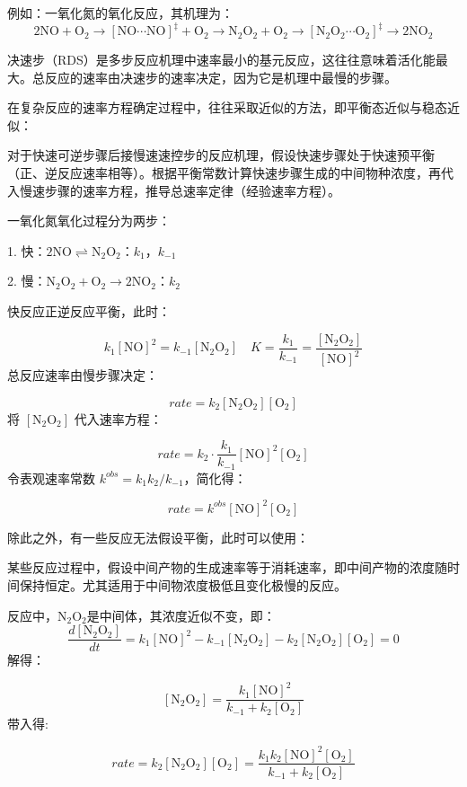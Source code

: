 例如：一氧化氮的氧化反应，其机理为：$$2\text{NO} + \text{O}_2 \longrightarrow [\text{NO} \cdots \text{NO}]^ \ddagger + \text{O}_2 \longrightarrow \text{N}_2\text{O}_2 + \text{O}_2 \longrightarrow  [\text{N}_2\text{O}_2 \cdots \text{O}_2]^\ddagger \longrightarrow 2\text{NO}_2 $$

\begin{definition}[决速步]
决速步（RDS）是多步反应机理中速率最小的基元反应，这往往意味着活化能最大。总反应的速率由决速步的速率决定，因为它是机理中最慢的步骤。
\end{definition}

在复杂反应的速率方程确定过程中，往往采取近似的方法，即平衡态近似与稳态近似：

\begin{proposition}[平衡态近似]
对于快速可逆步骤后接慢速速控步的反应机理，假设快速步骤处于快速预平衡（正、逆反应速率相等）。根据平衡常数计算快速步骤生成的中间物种浓度，再代入慢速步骤的速率方程，推导总速率定律（经验速率方程）。
\end{proposition}

\begin{example}
一氧化氮氧化过程分为两步：

1. 快：$2\text{NO} \rightleftharpoons  \text{N}_2\text{O}_2$：$k_{1}$，$k_{-1}$

2. 慢：$\text{N}_2\text{O}_2 + \text{O}_2 \longrightarrow 2\text{NO}_2$：$k_2$

快反应正逆反应平衡，此时：

$$k_1[\text{NO}]^2 = k_{-1}[\text{N}_2\text{O}_2] \quad K = \frac{k_1}{k_{-1}} = \frac{[\text{N}_2\text{O}_2]}{[\text{NO}]^2}$$
总反应速率由慢步骤决定：

$$rate = k_2 [\text{N}_2\text{O}_2][\text{O}_2]$$
将 $[\text{N}_2\text{O}_2]$ 代入速率方程：

$$rate = k_2 \cdot \frac{k_1}{k_{-1}} [\text{NO}]^2 [\text{O}_2]$$
令表观速率常数 $k^{obs} = k_1 k_2/k_{-1}$，简化得：

$$rate = k^{obs} [\text{NO}]^2 [\text{O}_2]$$
\end{example}

除此之外，有一些反应无法假设平衡，此时可以使用：

\begin{proposition}[稳态近似]
某些反应过程中，假设中间产物的生成速率等于消耗速率，即中间产物的浓度随时间保持恒定。尤其适用于中间物浓度极低且变化极慢的反应。
\end{proposition}

\begin{example}
反应中，$\text{N}_2\text{O}_2$是中间体，其浓度近似不变，即：
$$\frac{d[\text{N}_2\text{O}_2]}{dt} = k_1[\text{NO}]^2 - k_{-1}[\text{N}_2\text{O}_2] - k_2[\text{N}_2\text{O}_2][\text{O}_2] = 0$$
解得：

$$[\text{N}_2\text{O}_2] = \frac{k_1[\text{NO}]^2}{k_{-1} + k_2[\text{O}_2]}$$
带入得:

$$rate = k_2[\text{N}_2\text{O}_2][\text{O}_2] = \frac{k_1k_2[\text{NO}]^2[\text{O}_2]}{k_{-1} + k_2[\text{O}_2]}$$

\end{example}

